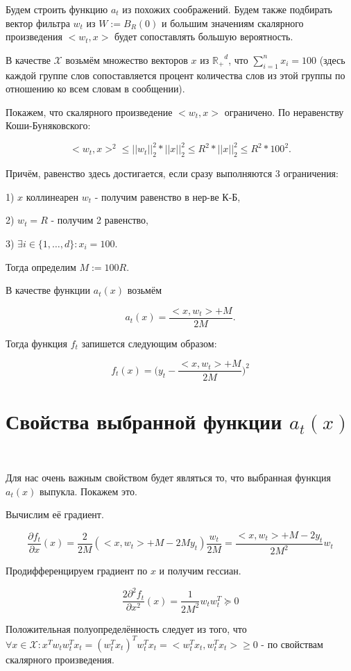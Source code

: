 \documentclass[12pt]{article}
\begin{document}
Будем строить функцию $a_t$ из похожих соображений. Будем также подбирать вектор фильтра $w_t$ из $W := B_R(0)$ и большим значениям скалярного произведения $<w_t, x>$ будет сопоставлять большую вероятность.

В качестве $\mathcal{X}$ возьмём множество векторов $x$ из $\mathbb{R_{+}}^d$, что $\sum\limits_{i=1}^n x_i = 100$ (здесь каждой группе слов сопоставляется процент количества слов из этой группы по отношению ко всем словам в сообщении).

Покажем, что скалярного произведение $<w_t, x>$ ограничено. По неравенству Коши-Буняковского:

$$<w_t, x>^2 \leq ||w_t||_2^2*||x||_2^2 \leq R^2*||x||_2^2 \leq R^2*100^2.$$

Причём, равенство здесь достигается, если сразу выполняются 3 ограничения:

1) $x$ коллинеарен $w_t$ - получим равенство в нер-ве К-Б,

2) $w_t=R$ - получим 2 равенство,

3) $\exists i \in \{1, \dots, d\}: x_i = 100$.

Тогда определим $M := 100R$.

В качестве функции $a_t(x)$ возьмём

 $$a_t(x) = \frac{<x, w_t>+M}{2M}.$$
 
 Тогда функция $f_t$ запишется следующим образом:
 
 $$f_t(x) = \bigg(y_t - \frac{<x, w_t>+M}{2M}\bigg)^2$$
 
\section*{Свойства выбранной функции $a_t(x)$}
$ $

Для нас очень важным свойством будет являться то, что выбранная функция $a_t(x)$ выпукла. Покажем это.

Вычислим её градиент.

$$\frac{\partial f_t}{\partial x}(x) = \frac{2}{2M}(<x, w_t>+M-2My_t)\frac{w_t}{2M} = \frac{<x, w_t>+M-2y_t}{2M^2}w_t$$

Продифференцируем градиент по $x$ и получим гессиан.

$$\frac{2\partial^2 f_t}{\partial x^2}(x) = \frac{1}{2M^2}w_tw_t^T \succeq 0$$

Положительная полуопределённость следует из того, что $\forall x \in \mathcal{X}: x^Tw_tw_t^Tx_t = (w_t^Tx_t)^Tw_t^Tx_t = <w_t^Tx_t, w_t^Tx_t> \geq 0$ - по свойствам скалярного произведения.
\end{document}
